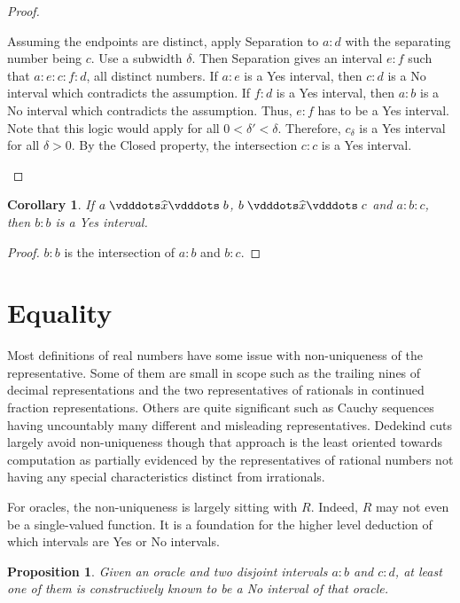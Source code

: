 \documentclass[12pt]{article}
\newtheorem{corollary}{Corollary}[section]
\newtheorem{proposition}{Proposition}[section]
\begin{document}
\begin{proof}
\begin{enumerate}
        Assuming the endpoints are distinct, apply Separation to $a:d$ with the separating number being $c$. Use a subwidth $\delta$. Then Separation gives an interval $e:f$ such that $a:e:c:f:d$, all distinct numbers. If $a:e$ is a Yes interval, then $c:d$ is a No interval which contradicts the assumption. If $f:d$ is a Yes interval, then $a:b$ is a No interval which contradicts the assumption. Thus, $e:f$ has to be a Yes interval. Note that this logic would apply for all $0 < \delta' < \delta$. Therefore, $c_\delta$ is a Yes interval for all $\delta > 0$. By the Closed property, the intersection $c:c$ is a Yes interval. 
     \end{enumerate}
\end{proof}

\begin{corollary}
    If $a \xora b$, $b \xora c$ and $a:b:c$, then $b:b$ is a Yes interval.
\end{corollary}

\begin{proof}
    $b:b$ is the intersection of $a:b$ and $b:c$.
\end{proof}


\section{Equality}\label{os:equality}

Most definitions of real numbers have some issue with non-uniqueness of the representative. Some of them are small in scope such as the trailing nines of decimal representations and the two representatives of rationals in continued fraction representations. Others are quite significant such as Cauchy sequences having uncountably many different and misleading representatives. Dedekind cuts largely avoid non-uniqueness though that approach is the least oriented towards computation as partially evidenced by the representatives of rational numbers not having any special characteristics distinct from irrationals. 

For oracles, the non-uniqueness is largely sitting with $R$. Indeed, $R$ may not even be a single-valued function. It is a foundation for the higher level deduction of which intervals are Yes or No intervals. 

\begin{proposition}
    Given an oracle and two disjoint intervals $a:b$ and $c:d$, at least one of them is constructively known to be a No interval of that oracle. 
\end{proposition}
\end{document}
